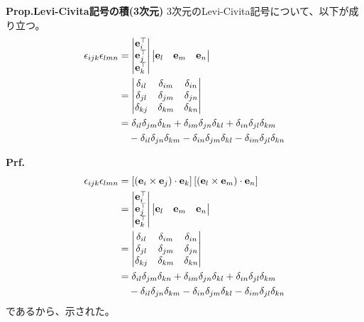 \documentclass[a4paper,11pt]{jsarticle}
\numberwithin{equation}{section}
\begin{document}
\begin{itembox}[l]{\textbf{Prop.Levi-Civita記号の積(3次元)}}
  3次元のLevi-Civita記号について、以下が成り立つ。
  \begin{align}
    \epsilon_{ijk}\epsilon_{lmn} &= 
    \begin{vmatrix}
      \vb{e}_i^{\top} \\
      \vb{e}_j^{\top} \\
      \vb{e}_k^{\top}
      \end{vmatrix}
      \begin{vmatrix}
      \vb{e}_l & \vb{e}_m & \vb{e}_n
      \end{vmatrix} \notag \\
      &=
      \begin{vmatrix}
      \delta_{il} & \delta_{im} & \delta_{in} \\
      \delta_{jl} & \delta_{jm} & \delta_{jn} \\
      \delta_{kj} & \delta_{km} & \delta_{kn}
      \end{vmatrix} \notag \\
      &= 
        \delta_{il} \delta_{jm} \delta_{kn} 
        + \delta_{im} \delta_{jn} \delta_{kl} 
        + \delta_{in} \delta_{jl} \delta_{km} \\
        &\quad- \delta_{il} \delta_{jn} \delta_{km} 
        - \delta_{in} \delta_{jm} \delta_{kl} 
        - \delta_{im} \delta_{jl} \delta_{kn}
  \end{align}
\end{itembox}
\textbf{Prf.}\\
\begin{align}
  \epsilon_{ijk} \epsilon_{lmn} 
  &=
  \left[ (\vb{e}_i \times \vb{e}_j) \cdot \vb{e}_k \right]
  \left[ (\vb{e}_l \times \vb{e}_m) \cdot \vb{e}_n \right] \notag \\
  &= 
  \begin{vmatrix}
  \vb{e}_i^{\top} \\
  \vb{e}_j^{\top} \\
  \vb{e}_k^{\top}
  \end{vmatrix}
  \begin{vmatrix}
  \vb{e}_l & \vb{e}_m & \vb{e}_n
  \end{vmatrix} \notag \\
  &=
  \begin{vmatrix}
  \delta_{il} & \delta_{im} & \delta_{in} \\
  \delta_{jl} & \delta_{jm} & \delta_{jn} \\
  \delta_{kj} & \delta_{km} & \delta_{kn}
  \end{vmatrix} \notag \\
  &= 
    \delta_{il} \delta_{jm} \delta_{kn} 
    + \delta_{im} \delta_{jn} \delta_{kl} 
    + \delta_{in} \delta_{jl} \delta_{km} \\
    &\quad- \delta_{il} \delta_{jn} \delta_{km} 
    - \delta_{in} \delta_{jm} \delta_{kl} 
    - \delta_{im} \delta_{jl} \delta_{kn}
  \end{align}
  であるから、示された。\hfill\qedsymbol\\
\end{document}
